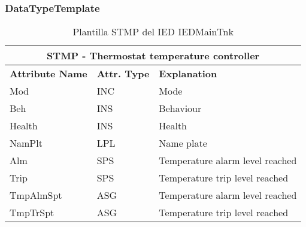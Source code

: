     \subsubsection{DataTypeTemplate}
    \begin{table}[H]
    \begin{center}
    \begin{tabular}{|l|l|p{8.5cm}|}
            \hline
            \multicolumn{3}{|c|}{\cellcolor[gray]{0.8} \textbf{ STMP}  - Thermostat temperature controller} \\
            \hline
            \textbf{Attribute Name} & \textbf{Attr. Type} & \textbf{Explanation} \\
            \hline 
            Mod & INC & Mode \\
            \hline
            Beh & INS & Behaviour \\
            \hline
            Health & INS & Health \\
            \hline
            NamPlt & LPL & Name plate \\
            \hline
            Alm & SPS & Temperature alarm level reached \\
            \hline
            Trip & SPS & Temperature trip level reached \\
            \hline
            TmpAlmSpt & ASG & Temperature alarm level reached \\
            \hline
            TmpTrSpt & ASG & Temperature trip level reached \\
            \hline
    \end{tabular}
    \caption{Plantilla STMP del IED IEDMainTnk}
    \label{table:lnTypeSTMP_thermostat}
    \end{center}
    \end{table}
    
    
    